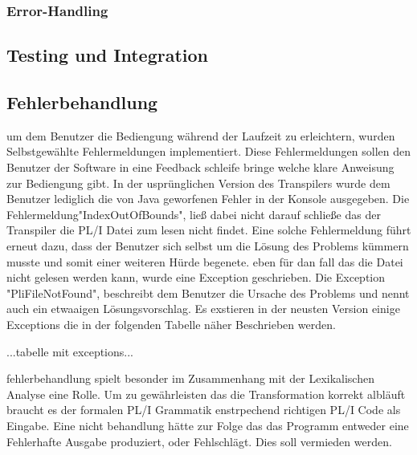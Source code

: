 {\subsubsection{Error-Handling}

\subsection{Testing und Integration}




\subsection{Fehlerbehandlung}
um dem Benutzer die Bediengung während der Laufzeit zu erleichtern, wurden Selbstgewählte Fehlermeldungen implementiert. Diese Fehlermeldungen sollen den Benutzer der Software in eine Feedback schleife bringe welche klare Anweisung zur Bediengung gibt. In der usprünglichen Version des Transpilers wurde dem Benutzer lediglich die von Java geworfenen Fehler in der Konsole ausgegeben. Die Fehlermeldung"IndexOutOfBounds", ließ dabei nicht darauf schließe das der Transpiler die PL/I Datei zum lesen nicht findet. Eine solche Fehlermeldung führt erneut dazu, dass der Benutzer sich selbst um die Lösung des Problems kümmern musste und somit einer weiteren Hürde begenete.
eben für dan fall das die Datei nicht gelesen werden kann, wurde eine Exception geschrieben. Die Exception "PliFileNotFound", beschreibt dem Benutzer die Ursache des Problems und nennt auch ein etwaaigen Lösungsvorschlag. Es exstieren in der neusten Version einige Exceptions die in der folgenden Tabelle näher Beschrieben werden.

...tabelle mit exceptions...

fehlerbehandlung spielt besonder im Zusammenhang mit der Lexikalischen Analyse eine Rolle. Um zu gewährleisten das die Transformation korrekt albläuft braucht es der formalen PL/I Grammatik enstrpechend richtigen PL/I Code als Eingabe. Eine nicht behandlung hätte zur Folge das das Programm entweder eine Fehlerhafte Ausgabe produziert, oder Fehlschlägt. Dies soll vermieden werden.

}
